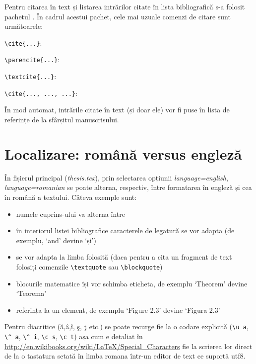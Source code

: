 Pentru citarea în text și listarea intrărilor citate în lista bibliografică s-a folosit pachetul . În cadrul acestui pachet, cele mai uzuale comenzi de citare sunt următoarele:
\begin{description}[style=nextline]
\item[citare simplă] \verb+\cite{...}+: \cite{bitsoris2006invariance}
\item[citare pusă între paranteze] \verb+\parencite{...}+: \parencite{gilbert1991linear}
\item[citare cu anul pus între paranteze] \verb+\textcite{...}+: \textcite{loechner1999polylib}
\item[citare cu intrări multiple] \verb+\cite{..., ..., ...}+: \cite{bellingham2002receding,garey1979computers,vitus_tunnel-milp:_2008,camponogara2002distributed}
\end{description}

În mod automat, intrările citate în text (și doar ele) vor fi puse în lista de referințe de la sfârșitul manuscrisului.


\section{Localizare: română versus engleză}

În fișierul principal (\emph{thesis.tex}), prin selectarea opțiunii \emph{language=english}, \emph{language=romanian} se poate alterna, respectiv, între formatarea în engleză și cea în română a textului. Câteva exemple sunt:
\begin{itemize}
\item numele cuprins-ului va alterna între 
\item în interiorul listei bibliografice caracterele de legatură se vor adapta (de exemplu, `and' devine `și')
\item {} se vor adapta la limba folosită (daca pentru a cita un fragment de text folosiți comenzile \verb+\textquote+ sau \verb+\blockquote+)
\item blocurile matematice își vor schimba eticheta, de exemplu `Theorem' devine `Teorema' 
\item referința la un element, de exemplu `Figure 2.3' devine `Figura 2.3'
\end{itemize}

Pentru diacritice (\u a,\^ a,\^ i, \c s, \c t etc.) se poate recurge fie la o codare explicită (\verb+\u a+, \verb+\^ a+, \verb+\^ i+, \verb+\c s+, \verb+\c t+) așa cum e detaliat în \url{http://en.wikibooks.org/wiki/LaTeX/Special_Characters} fie la scrierea lor direct de la o tastatura setată în limba romana într-un editor de text ce suportă utf8.


